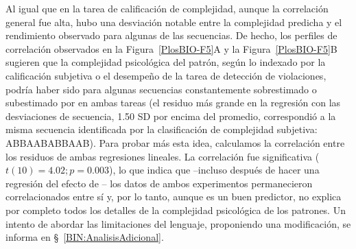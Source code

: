 
Al igual que en la tarea de calificación de complejidad, aunque la correlación general fue alta, hubo una desviación notable entre la complejidad predicha y el rendimiento observado para algunas de las secuencias. De hecho, los perfiles de correlación observados en la Figura~\ref{PlosBIO-F5}A y la Figura~\ref{PlosBIO-F5}B sugieren que la complejidad psicológica del patrón, según lo indexado por la calificación subjetiva o el desempeño de la tarea de detección de violaciones, podría haber sido para algunas secuencias constantemente sobrestimado o subestimado por \mdlbin en ambas tareas (el residuo más grande en la regresión con las desviaciones de secuencia, 1.50 SD por encima del promedio, correspondió a la misma secuencia identificada por la clasificación de complejidad subjetiva: ABBAABABBAAB). Para probar más esta idea, calculamos la correlación entre los residuos de ambas regresiones lineales. La correlación fue significativa ($t (10) = 4.02; p = 0.003$), lo que indica que --incluso después de hacer una regresión del efecto de \mdlbin-- los datos de ambos experimentos permanecieron correlacionados entre sí y, por lo tanto, aunque \mdlbin es un buen predictor, no explica por completo todos los detalles de la complejidad psicológica de los patrones. Un intento de abordar las limitaciones del lenguaje, proponiendo una modificación, se informa en \S~\ref{BIN:AnalisisAdicional}.


